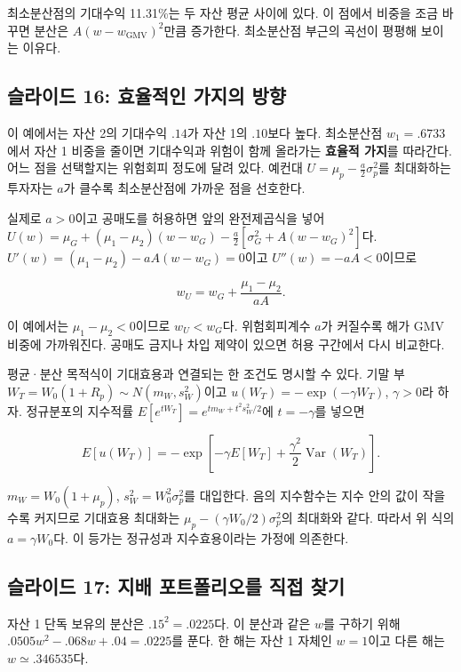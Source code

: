 \documentclass[11pt,a4paper]{article}
\begin{document}
최소분산점의 기대수익 11.31\%는 두 자산 평균 사이에 있다. 이 점에서 비중을 조금 바꾸면 분산은 $A(w-w_{\mathrm{GMV}})^2$만큼 증가한다. 최소분산점 부근의 곡선이 평평해 보이는 이유다.
\par

\subsection{슬라이드 16: 효율적인 가지의 방향}

이 예에서는 자산 2의 기대수익 $.14$가 자산 1의 $.10$보다 높다. 최소분산점 $w_1=.6733$에서 자산 1 비중을 줄이면 기대수익과 위험이 함께 올라가는 \textbf{효율적 가지}를 따라간다. 어느 점을 선택할지는 위험회피 정도에 달려 있다. 예컨대 $U=\mu_p-\tfrac a2\sigma_p^2$를 최대화하는 투자자는 $a$가 클수록 최소분산점에 가까운 점을 선호한다.
\par

실제로 $a>0$이고 공매도를 허용하면 앞의 완전제곱식을 넣어 $U(w)=\mu_G+(\mu_1-\mu_2)(w-w_G)-\tfrac a2[\sigma_G^2+A(w-w_G)^2]$다. $U'(w)=(\mu_1-\mu_2)-aA(w-w_G)=0$이고 $U''(w)=-aA<0$이므로
\par

\[
w_U=w_G+\frac{\mu_1-\mu_2}{aA}.
\]

이 예에서는 $\mu_1-\mu_2<0$이므로 $w_U<w_G$다. 위험회피계수 $a$가 커질수록 해가 GMV 비중에 가까워진다. 공매도 금지나 차입 제약이 있으면 허용 구간에서 다시 비교한다.
\par

평균·분산 목적식이 기대효용과 연결되는 한 조건도 명시할 수 있다. 기말 부 $W_T=W_0(1+R_p)\sim N(m_W,s_W^2)$이고 $u(W_T)=-\exp(-\gamma W_T)$, $\gamma>0$라 하자. 정규분포의 지수적률 $E[e^{tW_T}]=e^{tm_W+t^2s_W^2/2}$에 $t=-\gamma$를 넣으면
\par

\[
E[u(W_T)]=-\exp\!\left[-\gamma E[W_T]
+\frac{\gamma^2}{2}\operatorname{Var}(W_T)\right].
\]

$m_W=W_0(1+\mu_p)$, $s_W^2=W_0^2\sigma_p^2$를 대입한다. 음의 지수함수는 지수 안의 값이 작을수록 커지므로 기대효용 최대화는 $\mu_p-(\gamma W_0/2)\sigma_p^2$의 최대화와 같다. 따라서 위 식의 $a=\gamma W_0$다. 이 등가는 정규성과 지수효용이라는 가정에 의존한다.
\par

\subsection{슬라이드 17: 지배 포트폴리오를 직접 찾기}

자산 1 단독 보유의 분산은 $.15^2=.0225$다. 이 분산과 같은 $w$를 구하기 위해 $.0505w^2-.068w+.04=.0225$를 푼다. 한 해는 자산 1 자체인 $w=1$이고 다른 해는 $w\simeq.346535$다.
\par
\end{document}
